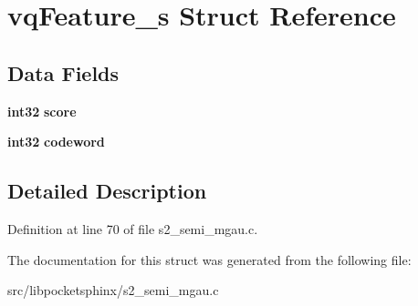 \section{vq\-Feature\-\_\-s \-Struct \-Reference}
\label{structvqFeature__s}
\subsection*{\-Data \-Fields}
\begin{DoxyCompactItemize}
\item 
{\bf int32} {\bfseries score}\label{structvqFeature__s_ad1095cdd1efb1a103de8ac96c3c9503c}

\item 
{\bf int32} {\bfseries codeword}\label{structvqFeature__s_a98d3a78ae272171bd123f41270bec238}

\end{DoxyCompactItemize}


\subsection{\-Detailed \-Description}


\-Definition at line 70 of file s2\-\_\-semi\-\_\-mgau.\-c.



\-The documentation for this struct was generated from the following file\-:\begin{DoxyCompactItemize}
\item 
src/libpocketsphinx/s2\-\_\-semi\-\_\-mgau.\-c\end{DoxyCompactItemize}
